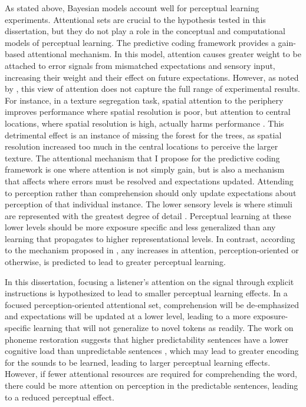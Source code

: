 As stated above, Bayesian models account well for perceptual learning experiments.
Attentional sets are crucial to the hypothesis tested in this dissertation, but they do not play a role in the conceptual and computational models of perceptual learning.
The predictive coding framework \citep{Clark2013} provides a gain-based attentional mechanism. 
In this model, attention causes greater weight to be attached to error signals from mismatched expectations and sensory input, increasing their weight and their effect on future expectations.  
However, as noted by \citet{Block2013}, this view of attention does not capture the full range of experimental results.  
For instance, in a texture segregation task, spatial attention to the periphery improves performance where spatial resolution is poor, but attention to central locations, where spatial resolution is high, actually harms performance \citep{Yeshurun1998}.  
This detrimental effect is an instance of missing the forest for the trees, as spatial resolution increased too much in the central locations to perceive the larger texture.  
The attentional mechanism that I propose for the predictive coding framework is one where attention is not simply gain, but is also a mechanism that affects where errors must be resolved and expectations updated.
Attending to perception rather than comprehension should only update expectations about perception of that individual instance.
The lower sensory levels is where stimuli are represented with the greatest degree of detail \citep{Gilbert2001}.
Perceptual learning at these lower levels should be more exposure specific and less generalized than any learning that propagates to higher representational levels.
In contrast, according to the mechanism proposed in \citet{Clark2013}, any increases in attention, perception-oriented or otherwise, is predicted to lead to greater perceptual learning.

In this dissertation, focusing a listener's attention on the signal through explicit instructions is hypothesized to lead to smaller perceptual learning effects.
In a focused perception-oriented attentional set, comprehension will be de-emphasized and expectations will be updated at a lower level, leading to a more exposure-specific learning that will not generalize to novel tokens as readily.
The work on phoneme restoration suggests that higher predictability sentences have a lower cognitive load than unpredictable sentences \citep{Samuel1981}, which may lead to greater encoding for the sounds to be learned, leading to larger perceptual learning effects.
However, if fewer attentional resources are required for comprehending the word, there could be more attention on perception in the predictable sentences, leading to a reduced perceptual effect.

